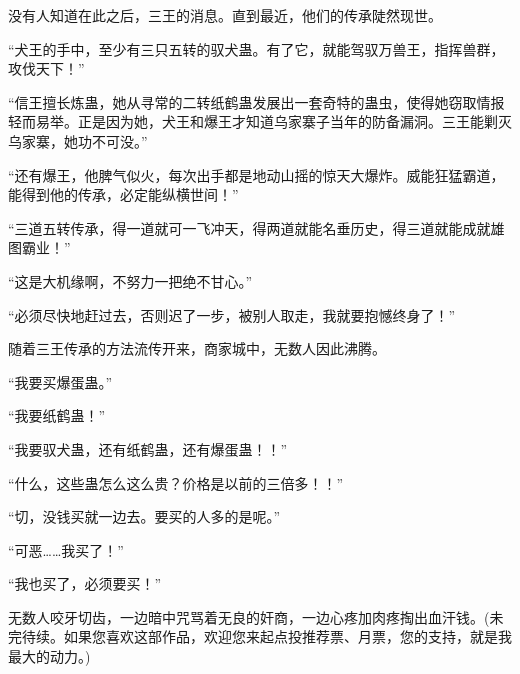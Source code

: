 \begin{this_body}
没有人知道在此之后，三王的消息。直到最近，他们的传承陡然现世。

“犬王的手中，至少有三只五转的驭犬蛊。有了它，就能驾驭万兽王，指挥兽群，攻伐天下！”

“信王擅长炼蛊，她从寻常的二转纸鹤蛊发展出一套奇特的蛊虫，使得她窃取情报轻而易举。正是因为她，犬王和爆王才知道乌家寨子当年的防备漏洞。三王能剿灭乌家寨，她功不可没。”

“还有爆王，他脾气似火，每次出手都是地动山摇的惊天大爆炸。威能狂猛霸道，能得到他的传承，必定能纵横世间！”

“三道五转传承，得一道就可一飞冲天，得两道就能名垂历史，得三道就能成就雄图霸业！”

“这是大机缘啊，不努力一把绝不甘心。”

“必须尽快地赶过去，否则迟了一步，被别人取走，我就要抱憾终身了！”

随着三王传承的方法流传开来，商家城中，无数人因此沸腾。

“我要买爆蛋蛊。”

“我要纸鹤蛊！”

“我要驭犬蛊，还有纸鹤蛊，还有爆蛋蛊！！”

“什么，这些蛊怎么这么贵？价格是以前的三倍多！！”

“切，没钱买就一边去。要买的人多的是呢。”

“可恶……我买了！”

“我也买了，必须要买！”

无数人咬牙切齿，一边暗中咒骂着无良的奸商，一边心疼加肉疼掏出血汗钱。(未完待续。如果您喜欢这部作品，欢迎您来起点投推荐票、月票，您的支持，就是我最大的动力。)

\end{this_body}

